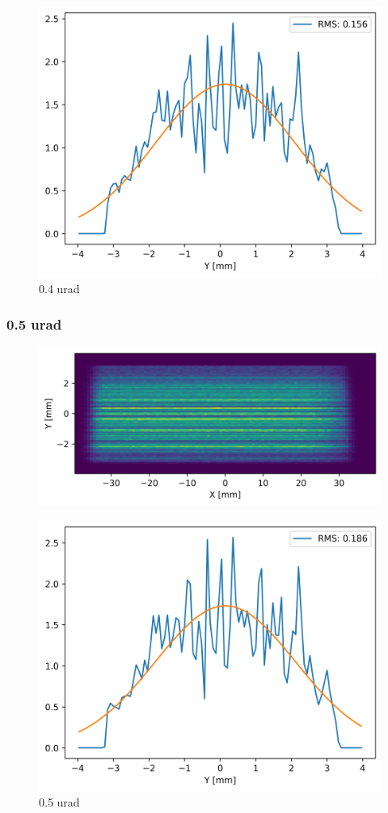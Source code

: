 \begin{figure}[H]
\centering
\includegraphics[width=0.9\linewidth]{./../figures/slope_error/WB4C_d30_d-spacing_gradient_45keV_slope_error04urad_Yprofile.png}
\caption{0.4 urad}
\label{fig:04urad}
\end{figure}

\clearpage
\subsubsection{0.5 urad}
\begin{figure}[H]
\centering
\includegraphics[width=0.9\linewidth]{./../figures/slope_error/WB4C_d30_d-spacing_gradient_45keV_slope_error05urad.png}
\end{figure}

\begin{figure}[H]
\centering
\includegraphics[width=0.9\linewidth]{./../figures/slope_error/WB4C_d30_d-spacing_gradient_45keV_slope_error05urad_Yprofile.png}
\caption{0.5 urad}
\label{fig:05urad}
\end{figure}

